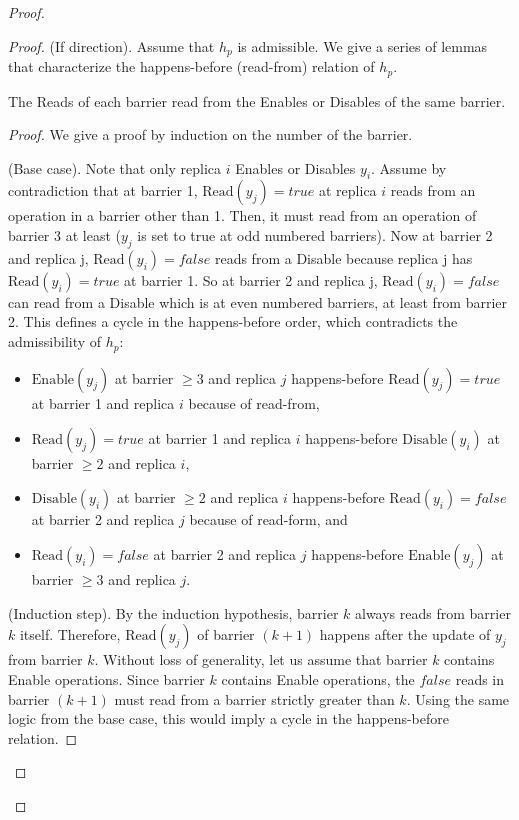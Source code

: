 \begin{proof}
\begin{proof}
    (If direction). Assume that $h_p$ is admissible. We give a series of lemmas that characterize the happens-before (read-from) relation of $h_p$.

  \begin{lemma}
    \label{crdt:flag:npc-proof:lemma1}
    The \textrm{Read}s of each barrier read from the \textrm{Enable}s or \textrm{Disable}s of the same barrier. 
  \end{lemma}

  \begin{proof}
    We give a proof by induction on the number of the barrier.
    
    \noindent
    (Base case). Note that only replica $i$ \textrm{Enable}s or \textrm{Disable}s $y_i$. Assume by contradiction that at barrier 1, $\mathrm{Read}(y_j) = true$ at replica $i$ reads from an operation in a barrier other than 1. Then, it must read from an operation of barrier 3 at least ($y_j$ is set to true at odd numbered barriers). Now at barrier 2 and replica j, $\mathrm{Read}(y_i) = false$ reads from a \textrm{Disable} because replica j has $\mathrm{Read}(y_i) = true$ at barrier 1. So at barrier 2 and replica j, $\mathrm{Read}(y_i) = false$ can read from a \textrm{Disable} which is at even numbered barriers, at least from barrier 2. This defines a cycle in the happens-before order, which contradicts the admissibility of $h_p$: 
    \begin{itemize}
    	\item $\mathrm{Enable}(y_j)$ at barrier $\geq3$ and replica $j$ happens-before $\mathrm{Read}(y_j) = true$ at barrier 1 and replica $i$ because of read-from, 
	\item $\mathrm{Read}(y_j) = true$ at barrier 1 and replica $i$ happens-before $\mathrm{Disable}(y_i)$ at barrier $\geq2$ and replica $i$,
	\item $\mathrm{Disable}(y_i)$ at barrier $\geq2$ and replica $i$ happens-before $\mathrm{Read}(y_i) = false$ at barrier 2 and replica $j$ because of read-form, and 
	\item $\mathrm{Read}(y_i) = false$ at barrier 2 and replica $j$ happens-before $\mathrm{Enable}(y_j)$ at barrier $\geq3$ and replica $j$.
   \end{itemize}
    
    \noindent
    (Induction step). By the induction hypothesis, barrier $k$ always reads from barrier $k$ itself. Therefore, $\mathrm{Read}(y_j)$ of barrier $(k+1)$ happens after the update of $y_j$ from barrier $k$. Without loss of generality, let us assume that barrier $k$ contains \textrm{Enable} operations. Since barrier $k$ contains  \textrm{Enable} operations, the $false$ reads in barrier $(k+1)$ must read from a barrier strictly greater than $k$. Using the same logic from the base case, this would imply a cycle in the happens-before relation. 
  \end{proof}


\end{proof}
\end{proof}
